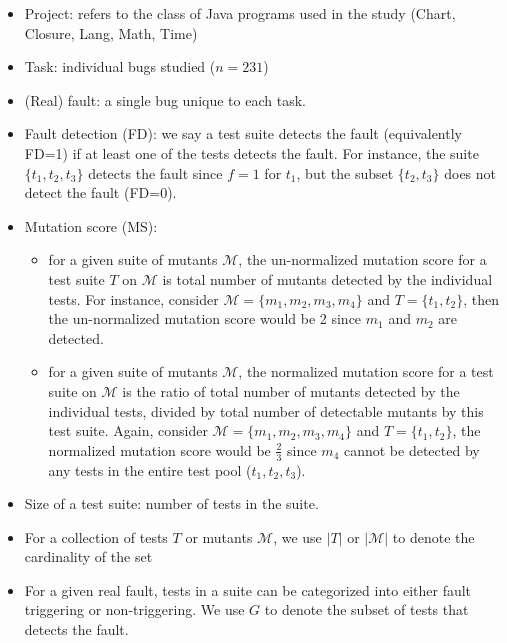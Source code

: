 \documentclass[10pt,letterpaper]{article}
\begin{document}
\begin{itemize}
    \item 
    Project: refers to the class of Java programs used in the study (Chart, Closure, Lang, Math, Time)
    \item
    Task: individual bugs studied ($n=231$)
    \item
    (Real) fault: a single bug unique to each task. 
    \item
    Fault detection (FD): we say a test suite detects the fault (equivalently FD=1) if at least one of the tests detects the fault. For instance, the suite $\{t_1,t_2,t_3\}$ detects the fault since $f=1$ for $t_1$, but the subset $\{t_2,t_3\}$ does not detect the fault (FD=0).
    
    \item
    Mutation score (MS): 
    \begin{itemize}
        \item 
        for a given suite of mutants $\mathcal{M}$, the un-normalized mutation score for a test suite $T$ on $\mathcal{M}$ is total number of mutants detected by the individual tests. 
        For instance, consider $\mathcal{M} = \{m_1,m_2,m_3,m_4\}$ and $T= \{t_1,t_2\}$, then the un-normalized mutation score would be 2 since $m_1$ and $m_2$ are detected.
        \item
        
        for a given suite of mutants $\mathcal{M}$, the normalized mutation score for a test suite on $\mathcal{M}$ is the ratio of total number of mutants detected by the individual tests, divided by total number of detectable mutants by this test suite. Again, consider  $\mathcal{M} = \{m_1,m_2,m_3,m_4\}$ and $T= \{t_1,t_2\}$, the normalized mutation score would be $\frac{2}{3}$ since $m_4$ cannot be detected by any tests in the entire test pool ($t_1,t_2,t_3$).
        
    \end{itemize}
    
    
    \item
    Size of a test suite: number of tests in the suite. 
    
    \item
    For a collection of tests $T$ or mutants $\mathcal{M}$, we use $|T|$ or $|\mathcal{M}|$ to denote the cardinality of the set
    \item
    For a given real fault, tests in a suite can be categorized into either fault triggering  or non-triggering. We use $G$ to denote the subset of tests that detects the fault.


\end{itemize}
\end{document}
